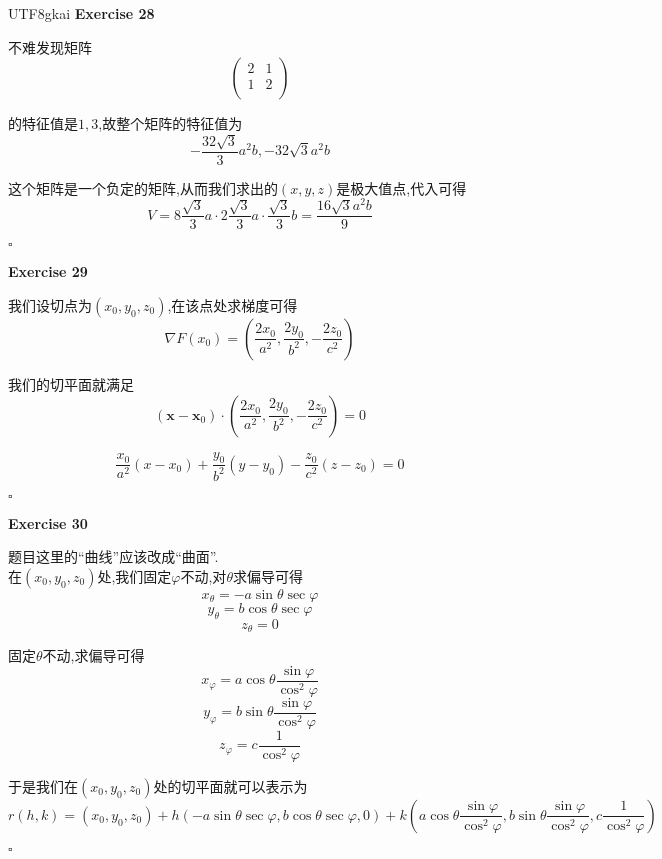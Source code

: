 \documentclass[11pt,hyperref,a4paper,UTF8]{ctexart}
\newenvironment{exercise}[1]{%
{\textbf{Exercise #1} \\ 
    }
}{
  \hfill $\square$ 
  \par\bigskip 
}
\newcommand{\RR}{\mathbb{R}}
\newcommand{\ve}{\boldsymbol}
\begin{document}
\begin{CJK}{UTF8}{gkai}
\begin{exercise}{28}
    不难发现矩阵
    \[\begin{pmatrix}
        2&1\\
        1&2\\
    \end{pmatrix}\]

    的特征值是$1,3$,故整个矩阵的特征值为
    \[-\frac{32\sqrt{3}}{3}a^2 b,-32\sqrt{3}a^2 b\]

    这个矩阵是一个负定的矩阵,从而我们求出的$(x,y,z)$是极大值点,代入可得
    \[V = 8 \frac{\sqrt{3}}{3} a\cdot 2\frac{\sqrt{3}}{3} a\cdot \frac{\sqrt{3}}{3} b = \frac{16\sqrt{3}a^2 b}{9}\]
\end{exercise}

\begin{exercise}{29}
    我们设切点为$(x_0,y_0,z_0)$,在该点处求梯度可得
    \[\nabla F(x_0) = (\frac{2x_0}{a^2},\frac{2y_0}{b^2} ,- \frac{2z_0}{c^2})\]

    我们的切平面就满足
    \[(\ve{x} - \ve{x}_0)\cdot (\frac{2x_0}{a^2},\frac{2y_0}{b^2}, - \frac{2z_0}{c^2}) = 0\]

    \[\frac{x_0}{a^2}(x - x_0) + \frac{y_0}{b^2}(y - y_0) - \frac{z_0}{c^2}(z - z_0) = 0\]


\end{exercise}

\begin{exercise}{30}
    题目这里的``曲线''应该改成``曲面''.\\

    在$(x_0,y_0,z_0)$处,我们固定$\varphi$不动,对$\theta$求偏导可得
    \[x_\theta = -a \sin \theta \sec \varphi\]
    \[y_\theta = b \cos \theta \sec \varphi\]
    \[z_\theta = 0\]

    固定$\theta$不动,求偏导可得
    \[x_\varphi = a \cos \theta \frac{\sin \varphi}{\cos^2 \varphi}\]
    \[y_\varphi = b \sin \theta \frac{\sin \varphi}{\cos^2 \varphi}\]
    \[z_\varphi = c \frac{1}{\cos^2 \varphi}\]

    于是我们在$(x_0,y_0,z_0)$处的切平面就可以表示为
    \[r(h,k) = (x_0,y_0,z_0) + h(-a \sin \theta \sec \varphi,b \cos \theta \sec \varphi,0) + k(a \cos \theta \frac{\sin \varphi}{\cos^2 \varphi},b \sin \theta \frac{\sin \varphi}{\cos^2 \varphi},c \frac{1}{\cos^2 \varphi})\]
\end{exercise}


\end{CJK}
\end{document}
